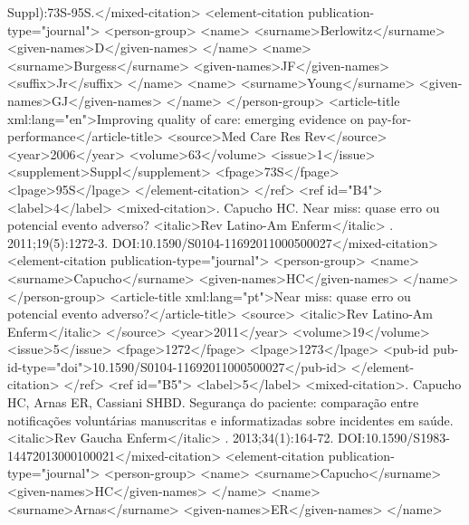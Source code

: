           Suppl):73S-95S.</mixed-citation>
        <element-citation publication-type="journal">
          <person-group>
            <name>
              <surname>Berlowitz</surname>
              <given-names>D</given-names>
            </name>
            <name>
              <surname>Burgess</surname>
              <given-names>JF</given-names>
              <suffix>Jr</suffix>
            </name>
            <name>
              <surname>Young</surname>
              <given-names>GJ</given-names>
            </name>
          </person-group>
          <article-title xml:lang="en">Improving quality of care: emerging evidence on
            pay-for-performance</article-title>
          <source>Med Care Res Rev</source>
          <year>2006</year>
          <volume>63</volume>
          <issue>1</issue>
          <supplement>Suppl</supplement>
          <fpage>73S</fpage>
          <lpage>95S</lpage>
        </element-citation>
      </ref>
      <ref id="B4">
        <label>4</label>
        <mixed-citation>. Capucho HC. Near miss: quase erro ou potencial evento adverso? <italic>Rev
            Latino-Am Enferm</italic> . 2011;19(5):1272-3.
          DOI:10.1590/S0104-11692011000500027</mixed-citation>
        <element-citation publication-type="journal">
          <person-group>
            <name>
              <surname>Capucho</surname>
              <given-names>HC</given-names>
            </name>
          </person-group>
          <article-title xml:lang="pt">Near miss: quase erro ou potencial evento
            adverso?</article-title>
          <source>
            <italic>Rev Latino-Am Enferm</italic>
          </source>
          <year>2011</year>
          <volume>19</volume>
          <issue>5</issue>
          <fpage>1272</fpage>
          <lpage>1273</lpage>
          <pub-id pub-id-type="doi">10.1590/S0104-11692011000500027</pub-id>
        </element-citation>
      </ref>
      <ref id="B5">
        <label>5</label>
        <mixed-citation>. Capucho HC, Arnas ER, Cassiani SHBD. Segurança do paciente: comparação
          entre notificações voluntárias manuscritas e informatizadas sobre incidentes em saúde.
            <italic>Rev Gaucha Enferm</italic> . 2013;34(1):164-72.
          DOI:10.1590/S1983-14472013000100021</mixed-citation>
        <element-citation publication-type="journal">
          <person-group>
            <name>
              <surname>Capucho</surname>
              <given-names>HC</given-names>
            </name>
            <name>
              <surname>Arnas</surname>
              <given-names>ER</given-names>
            </name>
